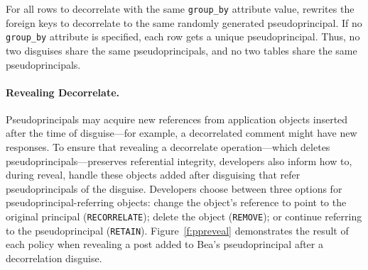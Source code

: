 %
For all rows to decorrelate with the same \texttt{group\_by} attribute value,
\sys rewrites the foreign keys to decorrelate to the same randomly generated
pseudoprincipal.
%
If no \texttt{group\_by} attribute is specified, each row gets a unique
pseudoprincipal.
%
Thus, no two disguises share the same pseudoprincipals, and no two tables share
the same pseudoprincipals.
%

%
\paragraph{Revealing Decorrelate.}
%
Pseudoprincipals may acquire new references from application objects inserted
after the time of disguise---for example, a decorrelated comment might have new
responses. To ensure that revealing a decorrelate operation---which deletes
pseudoprincipals---preserves referential integrity, developers also inform \sys
how to, during reveal, handle these objects added after disguising that refer
pseudoprincipals of the disguise. 
%
Developers choose between three options for pseudoprincipal-referring objects:
\one{} change the object's reference to point to the original principal
(\texttt{RECORRELATE}); \two{} delete the object (\texttt{REMOVE}); or \three{}
continue referring to the pseudoprincipal (\texttt{RETAIN}).
Figure~\ref{f:ppreveal} demonstrates the result of each policy when revealing a post
added to Bea's pseudoprincipal after a decorrelation disguise.
%
